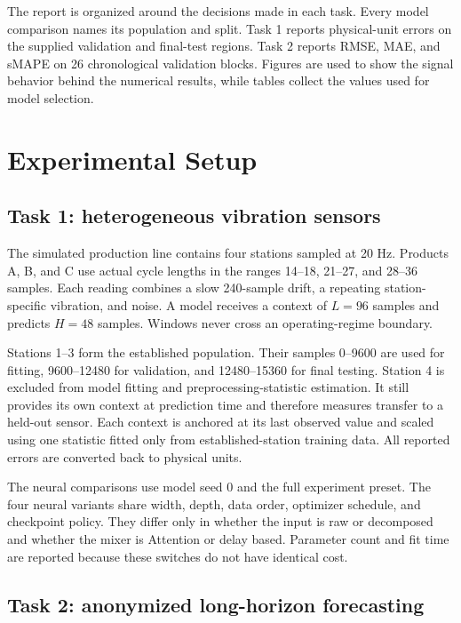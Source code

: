 \documentclass{article}
\begin{document}
The report is organized around the decisions made in each task. Every model comparison names its population and split. Task 1 reports physical-unit errors on the supplied validation and final-test regions. Task 2 reports RMSE, MAE, and sMAPE on 26 chronological validation blocks. Figures are used to show the signal behavior behind the numerical results, while tables collect the values used for model selection.

\section{Experimental Setup}
\label{sec:setup}

\subsection{Task 1: heterogeneous vibration sensors}

The simulated production line contains four stations sampled at 20 Hz. Products A, B, and C use actual cycle lengths in the ranges 14--18, 21--27, and 28--36 samples. Each reading combines a slow 240-sample drift, a repeating station-specific vibration, and noise. A model receives a context of $L=96$ samples and predicts $H=48$ samples. Windows never cross an operating-regime boundary.

Stations 1--3 form the established population. Their samples 0--9600 are used for fitting, 9600--12480 for validation, and 12480--15360 for final testing. Station 4 is excluded from model fitting and preprocessing-statistic estimation. It still provides its own context at prediction time and therefore measures transfer to a held-out sensor. Each context is anchored at its last observed value and scaled using one statistic fitted only from established-station training data. All reported errors are converted back to physical units.

The neural comparisons use model seed 0 and the full experiment preset. The four neural variants share width, depth, data order, optimizer schedule, and checkpoint policy. They differ only in whether the input is raw or decomposed and whether the mixer is Attention or delay based. Parameter count and fit time are reported because these switches do not have identical cost.

\subsection{Task 2: anonymized long-horizon forecasting}
\end{document}
